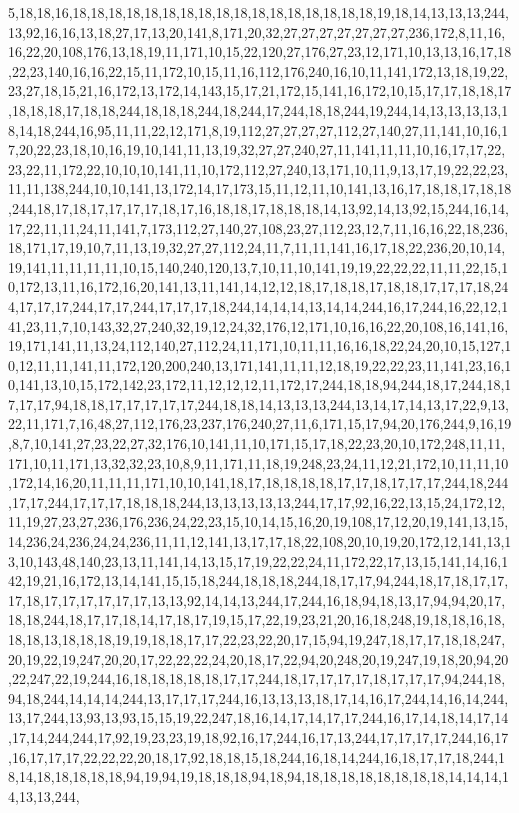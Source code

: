 5,18,18,16,18,18,18,18,18,18,18,18,18,18,18,18,18,18,18,18,18,19,18,14,13,13,13,244,13,92,16,16,13,18,27,17,13,20,141,8,171,20,32,27,27,27,27,27,27,27,236,172,8,11,16,16,22,20,108,176,13,18,19,11,171,10,15,22,120,27,176,27,23,12,171,10,13,13,16,17,18,22,23,140,16,16,22,15,11,172,10,15,11,16,112,176,240,16,10,11,141,172,13,18,19,22,23,27,18,15,21,16,172,13,172,14,143,15,17,21,172,15,141,16,172,10,15,17,17,18,18,17,18,18,18,17,18,18,244,18,18,18,244,18,244,17,244,18,18,244,19,244,14,13,13,13,13,18,14,18,244,16,95,11,11,22,12,171,8,19,112,27,27,27,27,112,27,140,27,11,141,10,16,17,20,22,23,18,10,16,19,10,141,11,13,19,32,27,27,240,27,11,141,11,11,10,16,17,17,22,23,22,11,172,22,10,10,10,141,11,10,172,112,27,240,13,171,10,11,9,13,17,19,22,22,23,11,11,138,244,10,10,141,13,172,14,17,173,15,11,12,11,10,141,13,16,17,18,18,17,18,18,244,18,17,18,17,17,17,17,18,17,16,18,18,17,18,18,18,14,13,92,14,13,92,15,244,16,14,17,22,11,11,24,11,141,7,173,112,27,140,27,108,23,27,112,23,12,7,11,16,16,22,18,236,18,171,17,19,10,7,11,13,19,32,27,27,112,24,11,7,11,11,141,16,17,18,22,236,20,10,14,19,141,11,11,11,11,10,15,140,240,120,13,7,10,11,10,141,19,19,22,22,22,11,11,22,15,10,172,13,11,16,172,16,20,141,13,11,141,14,12,12,18,17,18,18,17,18,18,17,17,17,18,244,17,17,17,244,17,17,244,17,17,17,18,244,14,14,14,13,14,14,244,16,17,244,16,22,12,141,23,11,7,10,143,32,27,240,32,19,12,24,32,176,12,171,10,16,16,22,20,108,16,141,16,19,171,141,11,13,24,112,140,27,112,24,11,171,10,11,11,16,16,18,22,24,20,10,15,127,10,12,11,11,141,11,172,120,200,240,13,171,141,11,11,12,18,19,22,22,23,11,141,23,16,10,141,13,10,15,172,142,23,172,11,12,12,12,11,172,17,244,18,18,94,244,18,17,244,18,17,17,17,94,18,18,17,17,17,17,17,244,18,18,14,13,13,13,244,13,14,17,14,13,17,22,9,13,22,11,171,7,16,48,27,112,176,23,237,176,240,27,11,6,171,15,17,94,20,176,244,9,16,19,8,7,10,141,27,23,22,27,32,176,10,141,11,10,171,15,17,18,22,23,20,10,172,248,11,11,171,10,11,171,13,32,32,23,10,8,9,11,171,11,18,19,248,23,24,11,12,21,172,10,11,11,10,172,14,16,20,11,11,11,171,10,10,141,18,17,18,18,18,18,17,17,18,17,17,17,244,18,244,17,17,244,17,17,17,18,18,18,244,13,13,13,13,13,244,17,17,92,16,22,13,15,24,172,12,11,19,27,23,27,236,176,236,24,22,23,15,10,14,15,16,20,19,108,17,12,20,19,141,13,15,14,236,24,236,24,24,236,11,11,12,141,13,17,17,18,22,108,20,10,19,20,172,12,141,13,13,10,143,48,140,23,13,11,141,14,13,15,17,19,22,22,24,11,172,22,17,13,15,141,14,16,142,19,21,16,172,13,14,141,15,15,18,244,18,18,18,244,18,17,17,94,244,18,17,18,17,17,17,18,17,17,17,17,17,17,13,13,92,14,14,13,244,17,244,16,18,94,18,13,17,94,94,20,17,18,18,244,18,17,17,18,14,17,18,17,19,15,17,22,19,23,21,20,16,18,248,19,18,18,16,18,18,18,13,18,18,18,19,19,18,18,17,17,22,23,22,20,17,15,94,19,247,18,17,17,18,18,247,20,19,22,19,247,20,20,17,22,22,22,24,20,18,17,22,94,20,248,20,19,247,19,18,20,94,20,22,247,22,19,244,16,18,18,18,18,18,17,17,244,18,17,17,17,17,18,17,17,17,94,244,18,94,18,244,14,14,14,244,13,17,17,17,244,16,13,13,13,18,17,14,16,17,244,14,16,14,244,13,17,244,13,93,13,93,15,15,19,22,247,18,16,14,17,14,17,17,244,16,17,14,18,14,17,14,17,14,244,244,17,92,19,23,23,19,18,92,16,17,244,16,17,13,244,17,17,17,17,244,16,17,16,17,17,17,22,22,22,20,18,17,92,18,18,15,18,244,16,18,14,244,16,18,17,17,18,244,18,14,18,18,18,18,18,94,19,94,19,18,18,18,94,18,94,18,18,18,18,18,18,18,18,14,14,14,14,13,13,244,